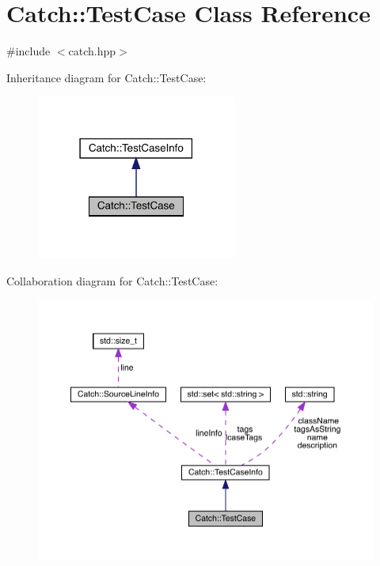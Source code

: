 \hypertarget{class_catch_1_1_test_case}{}\section{Catch\+:\+:Test\+Case Class Reference}
\label{class_catch_1_1_test_case}


{\ttfamily \#include $<$catch.\+hpp$>$}



Inheritance diagram for Catch\+:\+:Test\+Case\+:
\nopagebreak
\begin{figure}[H]
\begin{center}
\leavevmode
\includegraphics[width=186pt]{class_catch_1_1_test_case__inherit__graph}
\end{center}
\end{figure}


Collaboration diagram for Catch\+:\+:Test\+Case\+:
\nopagebreak
\begin{figure}[H]
\begin{center}
\leavevmode
\includegraphics[width=350pt]{class_catch_1_1_test_case__coll__graph}
\end{center}
\end{figure}
